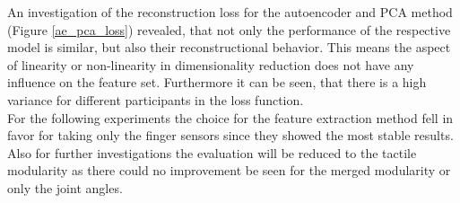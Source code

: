 An investigation of the reconstruction loss for the autoencoder and PCA method (Figure \ref{ae_pca_loss}) revealed, that not only the performance of the respective model is similar, but also their reconstructional behavior. This means the aspect of linearity or non-linearity in dimensionality reduction does not have any influence on the feature set. Furthermore it can be seen, that there is a high variance for different participants in the loss function.\\
For the following experiments the choice for the feature extraction method fell in favor for taking only the finger sensors since they showed the most stable results. Also for further investigations the evaluation will be reduced to the tactile modularity as there could no improvement be seen for the merged modularity or only the joint angles.
